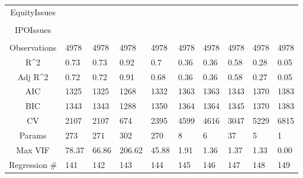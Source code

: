 \documentclass{article}
\begin{document}
\begin{table}[H]
\begin{tabular}{|clllllllll|}
  EquityIssues &  &  &  &  &  &  &  &  &  \\ 
   &  &  &  &  &  &  &  &  &  \\ 
  IPOIssues &  &  &  &  &  &  &  &  &  \\ 
   &  &  &  &  &  &  &  &  &  \\ 
  \hline 
 Observations & 4978 & 4978 & 4978 & 4978 & 4978 & 4978 & 4978 & 4978 & 4978 \\ 
  R^2 & 0.73 & 0.73 & 0.92 & 0.7 & 0.36 & 0.36 & 0.58 & 0.28 & 0.05 \\ 
  Adj R^2 & 0.72 & 0.72 & 0.91 & 0.68 & 0.36 & 0.36 & 0.58 & 0.27 & 0.05 \\ 
  AIC & 1325 & 1325 & 1268 & 1332 & 1363 & 1363 & 1343 & 1370 & 1383 \\ 
  BIC & 1343 & 1343 & 1288 & 1350 & 1364 & 1364 & 1345 & 1370 & 1383 \\ 
  CV & 2107 & 2107 & 674 & 2395 & 4599 & 4616 & 3047 & 5229 & 6815 \\ 
  Params & 273 & 271 & 302 & 270 & 8 & 6 & 37 & 5 & 1 \\ 
  Max VIF & 78.37 & 66.86 & 206.62 & 45.88 & 1.91 & 1.36 & 1.37 & 1.33 & 0.00 \\ 
  Regression \# & 141 & 142 & 143 & 144 & 145 & 146 & 147 & 148 & 149 \\ 
   \hline
\end{tabular}
 
\end{table}
\end{document}
